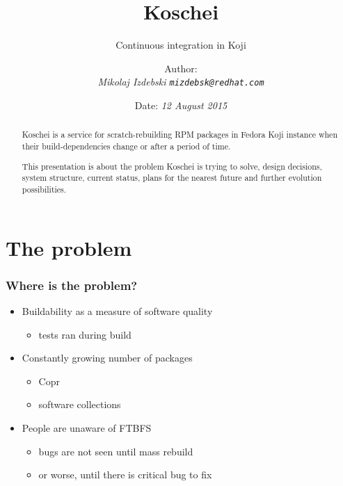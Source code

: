 \documentclass[pdftex,unicode,xcolor=table]{beamer}
\title{Koschei}
\subtitle{Continuous integration in Koji}
\author{Author: \\
  \em{Mikolaj Izdebski}
  \tt{mizdebsk@redhat.com}}
\date{Date: \em{12 August 2015}}
\begin{document}
\begin{rhbg}
  \begin{frame}
    \titlepage
    \begin{abstract}
Koschei is a service for scratch-rebuilding RPM packages in Fedora Koji
instance when their build-dependencies change or after a period of time.

This presentation is about the problem Koschei is trying to solve, design decisions,
system structure, current status, plans for the nearest future and further
evolution possibilities.
    \end{abstract}
  \end{frame}
\end{rhbg}


\section{The problem}
\Large
\begin{frame}
  \frametitle{Where is the problem?}
  \begin{itemize}
  \item Buildability as a measure of software quality
    \begin{itemize}
      \item tests ran during build
    \end{itemize}
  \item Constantly growing number of packages
    \begin{itemize}
      \item Copr
      \item software collections
    \end{itemize}
  \item People are unaware of FTBFS
    \begin{itemize}
      \item bugs are not seen until mass rebuild
      \item or worse, until there is critical bug to fix
    \end{itemize}
  \end{itemize}
\end{frame}
\end{document}
